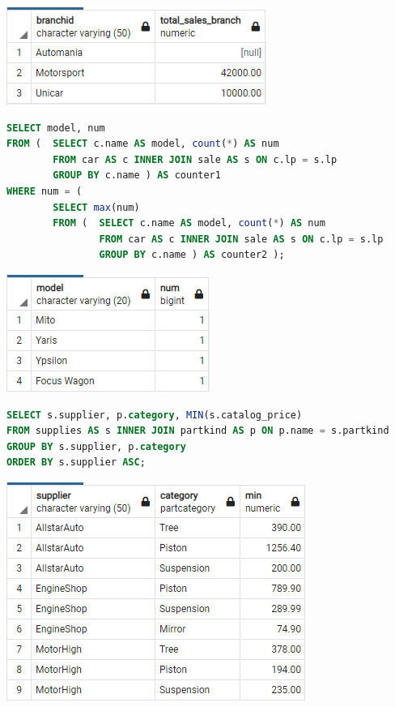 \begin{center}
	\includegraphics[scale=0.75]{2query.png}
\end{center}

\begin{lstlisting}[language=SQL,
keywordstyle=\color{blue},
stringstyle=\color{mauve},
showstringspaces=false,
basicstyle=\ttfamily\footnotesize]
SELECT model, num
FROM (  SELECT c.name AS model, count(*) AS num
        FROM car AS c INNER JOIN sale AS s ON c.lp = s.lp
        GROUP BY c.name ) AS counter1
WHERE num = (
        SELECT max(num)
        FROM (  SELECT c.name AS model, count(*) AS num
                FROM car AS c INNER JOIN sale AS s ON c.lp = s.lp
                GROUP BY c.name ) AS counter2 );
\end{lstlisting}

\begin{center}
	\includegraphics[scale=0.75]{3query.png}
\end{center}

\begin{lstlisting}[language=SQL,
keywordstyle=\color{blue},
stringstyle=\color{mauve},
showstringspaces=false,
basicstyle=\ttfamily\footnotesize]
SELECT s.supplier, p.category, MIN(s.catalog_price)
FROM supplies AS s INNER JOIN partkind AS p ON p.name = s.partkind
GROUP BY s.supplier, p.category
ORDER BY s.supplier ASC;
\end{lstlisting}

\begin{center}
	\includegraphics[scale=0.75]{4query.png}
\end{center}
